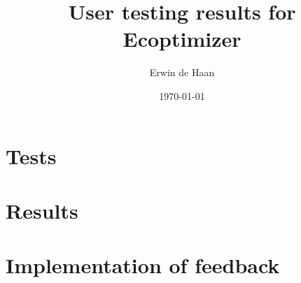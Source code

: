 \documentclass[final,a4paper,11pt]{article}
\author{Erwin de Haan}
\title{User testing results for Ecoptimizer}
\date{\today}
\begin{document}
\maketitle

\section{Tests}

\section{Results}

\section{Implementation of feedback}
\end{document}
